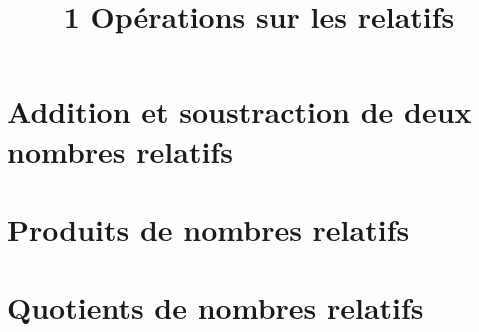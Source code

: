\documentclass[12pt,a4paper]{article}
\date{}
\title{\textcircled{{\normalsize{1}}} Opérations sur les relatifs}
\begin{document}
	
	\maketitle



%
%
%
%
%
%
 
\section{Addition et soustraction de deux nombres relatifs}



\newpage

%
%

\section{Produits de nombres relatifs}



\section{Quotients de nombres relatifs}


\end{document}
